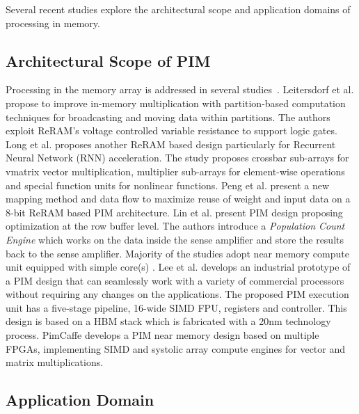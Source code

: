 Several recent studies explore the architectural scope and application domains of processing in memory.

\subsection{Architectural Scope of PIM}

Processing in the memory array is addressed in several studies~\cite{03,06,13,15,20,29}. Leitersdorf et al. \cite{13} propose to improve in-memory multiplication with partition-based computation techniques for broadcasting and moving data within partitions. The authors exploit ReRAM's voltage controlled variable resistance to support logic gates. Long et al. \cite{20} proposes another ReRAM based design particularly for Recurrent Neural Network (RNN) acceleration. The study proposes crossbar sub-arrays for vmatrix vector multiplication, multiplier sub-arrays for element-wise operations and special function units for nonlinear functions. Peng et al. \cite{15} present a new mapping method and data flow to maximize reuse of weight and input data on a 8-bit ReRAM based PIM architecture. 
Lin et al. \cite{31} present PIM design proposing optimization at the row buffer level. The authors introduce a \textit{Population Count Engine} which works on the data inside the sense amplifier and store the results back to the sense amplifier. Majority of the studies adopt near memory compute unit equipped with simple core(s) \cite{01,02,05,11,12,17,30,32,33,34,35}. Lee et al. \cite{12} develops an industrial prototype of a PIM design that can seamlessly work with a variety of commercial processors without requiring any changes on the applications. The proposed PIM execution unit has a five-stage pipeline, 16-wide SIMD FPU, registers and controller. This design is based on a HBM stack which is fabricated with a 20nm technology process. PimCaffe \cite{16} develops a PIM near memory design based on multiple FPGAs, implementing SIMD and systolic array compute engines for vector and matrix multiplications.       

\subsection{Application Domain}

